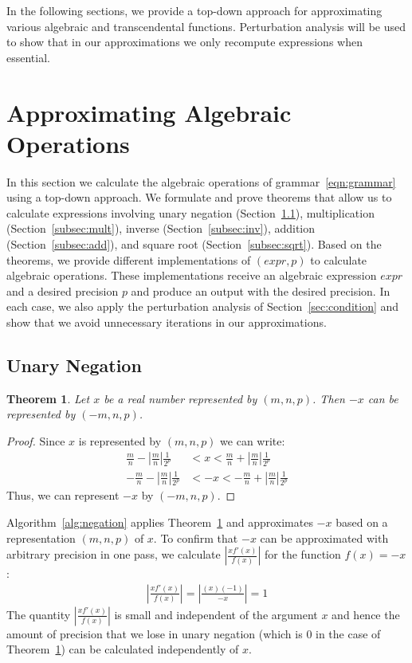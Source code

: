 \documentclass{article}
\newtheorem{mytheorem}{Theorem}
\numberwithin{mytheorem}{section}
\begin{document}
In the following sections, we provide a top-down approach for approximating various algebraic and transcendental functions. Perturbation analysis will be used to show that  in our approximations we only recompute expressions when essential. 

\section{Approximating Algebraic Operations}
\label{sec:algebraic_operations}
In this section we calculate the algebraic operations of grammar~\eqref{eqn:grammar} using a top-down approach. We formulate and prove theorems that allow us to calculate expressions involving unary negation (Section~\ref{subsec:neg}), multiplication (Section~\ref{subsec:mult}), inverse (Section~\ref{subsec:inv}), addition (Section~\ref{subsec:add}), and square root (Section~\ref{subsec:sqrt}). Based on the theorems, we provide different implementations of $(expr,p)$ to calculate algebraic operations. These implementations receive an algebraic expression $expr$ and a desired precision $p$ and produce an output with the desired precision. In each case, we also apply the perturbation analysis of Section~\ref{sec:condition} and show that we avoid unnecessary iterations in our approximations.
 
\subsection{Unary Negation}
\label{subsec:neg} 
\begin{mytheorem}\label{thm:unary_neg}
Let $x$ be a real number represented by $(m,n,p)$. Then $-x$ can be represented by $(-m,n,p)$.
\end{mytheorem}
\begin{proof}
Since $x$ is represented by $(m,n,p)$ we can write: 
\begin{align*}
\frac{m}{n}-|\frac{m}{n}|\frac{1}{2^p}&<x<\frac{m}{n}+|\frac{m}{n}|\frac{1}{2^p}\\
-\frac{m}{n}-|\frac{m}{n}|\frac{1}{2^p}&<-x<-\frac{m}{n}+|\frac{m}{n}|\frac{1}{2^p}
\end{align*}
Thus, we can represent $-x$ by $(-m,n,p)$.

\end{proof}

Algorithm~\ref{alg:negation} applies Theorem~\ref{thm:unary_neg} and approximates $-x$ based on a representation $(m,n,p)$ of $x$. To confirm that $-x$ can be approximated with arbitrary precision in one pass, we calculate $|\frac{xf'(x)}{f(x)}|$ for the function $f(x)=-x$:
\begin{align*}
|\frac{xf'(x)}{f(x)}|=|\frac{(x)(-1)}{-x}|=1
\end{align*} 
The quantity $|\frac{xf'(x)}{f(x)}|$ is small and independent of the argument $x$ and hence the amount of precision that we lose in unary negation (which is $0$ in the case of Theorem~\ref{thm:unary_neg}) can be calculated independently of $x$.
\end{document}
